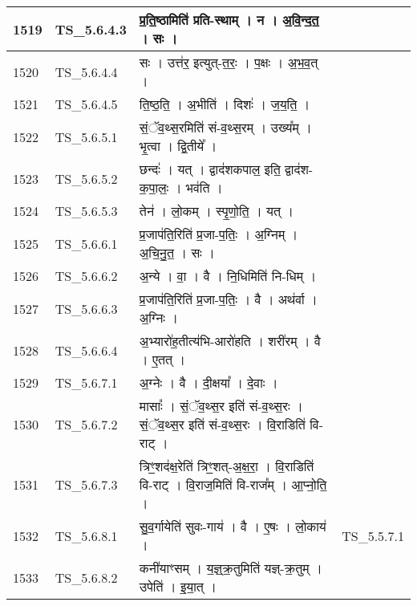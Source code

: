 \documentclass[17pt]{extarticle}
\begin{document}
\begin{longtable}{||p{0.4in}||p{0.9in}||p{4.0in}||p{0.9in}||}
        \hline
            1519 & TS\_5.6.4.3 & प्र॒ति॒ष्ठामिति॑ प्रति{-}स्थाम्   ।   न   ।   अ॒वि॒न्द॒त॒   ।   सः   ।    &      \\
        \hline
            1520 & TS\_5.6.4.4 & सः   ।   उत्त॑र॒ इत्युत्{-}त॒रः॒   ।   प॒क्षः   ।   अ॒भ॒व॒त्   ।    &      \\
        \hline
            1521 & TS\_5.6.4.5 & ति॒ष्ठ॒ति॒   ।   अ॒भीति॑   ।   दिशः॑   ।   ज॒य॒ति॒   ।    &      \\
        \hline
            1522 & TS\_5.6.5.1 & सं॒ॅव॒थ्स॒रमिति॑ सं{-}व॒थ्स॒रम्   ।   उख्य᳚म्   ।   भृ॒त्वा   ।   द्वि॒तीये᳚   ।    &      \\
        \hline
            1523 & TS\_5.6.5.2 & छन्दः॑   ।   यत्   ।   द्वाद॑शकपाल॒ इति॒ द्वाद॑श{-}क॒पा॒लः॒   ।   भव॑ति   ।    &      \\
        \hline
            1524 & TS\_5.6.5.3 & तेन॑   ।   लो॒कम्   ।   स्पृ॒णो॒ति॒   ।   यत्   ।    &      \\
        \hline
            1525 & TS\_5.6.6.1 & प्र॒जाप॑ति॒रिति॑ प्र॒जा{-}प॒तिः॒   ।   अ॒ग्निम्   ।   अ॒चि॒नु॒त॒   ।   सः   ।    &      \\
        \hline
            1526 & TS\_5.6.6.2 & अ॒न्ये   ।   वा॒   ।   वै   ।   नि॒धिमिति॑ नि{-}धिम्   ।    &      \\
        \hline
            1527 & TS\_5.6.6.3 & प्र॒जाप॑ति॒रिति॑ प्र॒जा{-}प॒तिः॒   ।   वै   ।   अथ॑र्वा   ।   अ॒ग्निः   ।    &      \\
        \hline
            1528 & TS\_5.6.6.4 & अ॒भ्यारो॑ह॒तीत्य॑भि{-}आरो॑हति   ।   शरी॑रम्   ।   वै   ।   ए॒तत्   ।    &      \\
        \hline
            1529 & TS\_5.6.7.1 & अ॒ग्नेः   ।   वै   ।   दी॒क्षया᳚   ।   दे॒वाः   ।    &      \\
        \hline
            1530 & TS\_5.6.7.2 & मासाः᳚   ।   सं॒ॅव॒थ्स॒र इति॑ सं{-}व॒थ्स॒रः   ।   सं॒ॅव॒थ्स॒र इति॑ सं{-}व॒थ्स॒रः   ।   वि॒राडिति॑ वि{-}  राट्   ।    &      \\
        \hline
            1531 & TS\_5.6.7.3 & त्रिꣳ॒॒शद॑क्ष॒रेति॑ त्रिꣳ॒॒शत्{-}अ॒क्ष॒रा॒   ।   वि॒राडिति॑ वि{-}राट्   ।   वि॒राज॒मिति॑ वि{-}राज᳚म्   ।   आ॒प्नो॒ति॒   ।    &      \\
        \hline
            1532 & TS\_5.6.8.1 & सु॒व॒र्गायेति॑ सुवः{-}गाय॑   ।   वै   ।   ए॒षः   ।   लो॒काय॑   ।    & TS\_5.5.7.1        \\
        \hline
            1533 & TS\_5.6.8.2 & कनी॑याꣳसम्   ।   य॒ज्ञ्॒क्र॒तुमिति॑ यज्ञ्{-}क्र॒तुम्   ।   उपेति॑   ।   इ॒या॒त्   ।    &      \\

\end{longtable}
\end{document}

